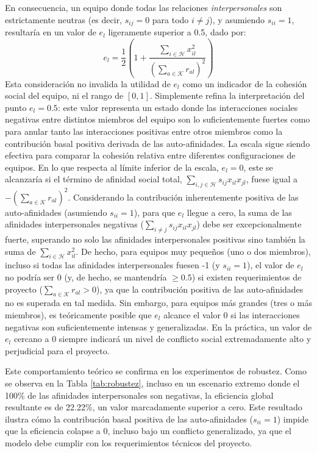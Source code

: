 \documentclass[conference]{IEEEtran}
\begin{document}
En consecuencia, un equipo donde todas las relaciones \textit{interpersonales} son estrictamente neutras (es decir, $s_{ij}=0$ para todo $i \neq j$), y asumiendo $s_{ii}=1$, resultaría en un valor de $e_l$ ligeramente superior a 0.5, dado por:
\[ e_l = \frac{1}{2} \left( 1 + \frac{\sum_{i \in \mathcal{H}} x_{il}^2}{\left(\sum_{a \in \mathcal{K}} r_{al}\right)^2} \right) \]
Esta consideración no invalida la utilidad de $e_l$ como un indicador de la cohesión social del equipo, ni el rango de $[0,1]$. Simplemente refina la interpretación del punto $e_l=0.5$: este valor representa un estado donde las interacciones sociales negativas entre distintos miembros del equipo son lo suficientemente fuertes como para anular tanto las interacciones positivas entre otros miembros como la contribución basal positiva derivada de las auto-afinidades. La escala sigue siendo efectiva para comparar la cohesión relativa entre diferentes configuraciones de equipos. En lo que respecta al límite inferior de la escala, $e_l=0$, este se alcanzaría si el término de afinidad social total, $\sum_{i,j \in \mathcal{H}} s_{ij} x_{il} x_{jl}$, fuese igual a $-\left(\sum_{a \in \mathcal{K}} r_{al}\right)^2$. Considerando la contribución inherentemente positiva de las auto-afinidades (asumiendo $s_{ii}=1$), para que $e_l$ llegue a cero, la suma de las afinidades interpersonales negativas ($\sum_{i \neq j} s_{ij} x_{il} x_{jl}$) debe ser excepcionalmente fuerte, superando no solo las afinidades interpersonales positivas sino también la suma de $\sum_{i \in \mathcal{H}} x_{il}^2$. De hecho, para equipos muy pequeños (uno o dos miembros), incluso si todas las afinidades interpersonales fuesen -1 (y $s_{ii}=1$), el valor de $e_l$ no podría ser 0 (y, de hecho, se mantendría $\geq 0.5$) si existen requerimientos de proyecto ($\sum_{a \in \mathcal{K}} r_{al} > 0$), ya que la contribución positiva de las auto-afinidades no es superada en tal medida. Sin embargo, para equipos más grandes (tres o más miembros), es teóricamente posible que $e_l$ alcance el valor 0 si las interacciones negativas son suficientemente intensas y generalizadas. En la práctica, un valor de $e_l$ cercano a 0 siempre indicará un nivel de conflicto social extremadamente alto y perjudicial para el proyecto.

Este comportamiento teórico se confirma en los experimentos de robustez. Como se observa en la Tabla \ref{tab:robustez}, incluso en un escenario extremo donde el 100\% de las afinidades interpersonales son negativas, la eficiencia global resultante es de 22.22\%, un valor marcadamente superior a cero. Este resultado ilustra cómo la contribución basal positiva de las auto-afinidades ($s_{ii}=1$) impide que la eficiencia colapse a 0, incluso bajo un conflicto generalizado, ya que el modelo debe cumplir con los requerimientos técnicos del proyecto.
\end{document}
